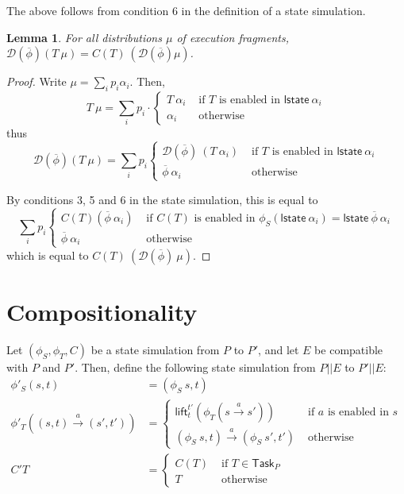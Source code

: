 \documentclass{article}
\newcommand{\Task}{\mathsf{Task}}
\newcommand{\lst}{\mathsf{lstate}}
\newcommand{\D}{\mathcal{D}}
\newtheorem{lemma}{Lemma}
\begin{document}
The above follows from condition 6 in the definition of a state simulation.

\begin{lemma}
    For all distributions $\mu$ of execution fragments, $\D(\overline{\phi})(T\ \mu) = C(T)\ (\D(\overline{\phi}) \mu)$.
\end{lemma}
\begin{proof}
    Write $\mu = \sum_i p_i \alpha_i$. Then, 
    \[T\ \mu = \sum_i p_i \cdot \begin{cases} T\ \alpha_i & \text{ if $T$ is enabled in $\lst\ \alpha_i$} \\
                                        \alpha_i & \text{ otherwise } \end{cases} \] 
    thus
    \[\D(\overline{\phi})(T\ \mu) = \sum_i p_i \begin{cases} \D(\overline{\phi})\ (T\ \alpha_i) & \text{ if $T$ is enabled in $\lst\ \alpha_i$} \\
            \overline{\phi}\ \alpha_i & \text{ otherwise } \end{cases} \] 

    By conditions 3, 5 and 6 in the state simulation, this is equal to
    \[\sum_i p_i \begin{cases} C(T) (\overline{\phi}\ \alpha_i)  & \text{ if $C(T)$ is enabled in $\phi_S (\lst\ \alpha_i) = \lst\ \overline{\phi}\ \alpha_i$} \\
            \overline{\phi}\ \alpha_i & \text{ otherwise } \end{cases} \] 
    which is equal to $C(T)\ (\D(\overline{\phi})\ \mu)$.

\end{proof}

\section{Compositionality}
Let $(\phi_S, \phi_T, C)$ be a state simulation from $P$ to $P'$, and let $E$ be compatible with $P$ and $P'$. Then, define the following state simulation from $P || E$ to $P' || E$:
\begin{align*}
    \phi'_S (s,t) &= (\phi_S\ s, t) \\
    \phi'_T ((s,t) \xrightarrow{a} (s', t')) &=
        \begin{cases}
            \mathsf{lift}_t^{t'} (\phi_T (s \xrightarrow{a} s')) & \text{ if $a$ is enabled in $s$ } \\
            (\phi_S\ s,t) \xrightarrow{a} (\phi_S\ s', t') & \text{ otherwise } 
        \end{cases} \\
    C' T &= \begin{cases}
        C(T) & \text{ if $T \in \Task_P$ } \\
        T & \text{ otherwise }
    \end{cases}
\end{align*}
\end{document}
